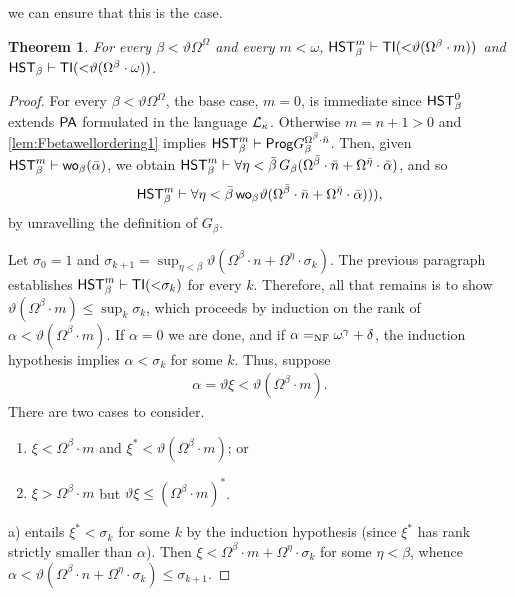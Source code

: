 \documentclass[UKenglish,cleveref,DIV=12]{scrartcl}
\newtheorem{theorem}{Theorem}[section]
\theoremstyle{definition}
\theoremstyle{definition}
\begin{document}
we can ensure that this is the case. %
\begin{theorem}\label{thm:Fbetalowerbound}
  For every $\beta<\vartheta\Omega^\Omega$ and every $m<\omega$,
  $\mathsf{HST}_\beta^{m}\vdash\mathsf{TI}(\mathord<\vartheta(\Omega^\beta\cdot m))$ and $\mathsf{HST}_\beta\vdash\mathsf{TI}(\mathord<\vartheta(\Omega^\beta\cdot\omega))$.
\end{theorem}
\begin{proof}
For every $\beta<\vartheta\Omega^\Omega$, the base case, $m=0$, is immediate
since $\mathsf{HST}_\beta^0$ extends $\mathsf{PA}$ formulated in the language $\mathcal{L}_\kappa$.
Otherwise $m=n+1>0$ and \cref{lem:Fbetawellordering1} implies $\mathsf{HST}_\beta^m\vdash\mathsf{Prog}
G_\beta^{\Omega^{\bar\beta}\cdot\bar n}$. Then, given $\mathsf{HST}_\beta^m\vdash
\mathsf{wo}_\beta(\bar \alpha)$, we obtain $\mathsf{HST}_\beta^m\vdash
\forall\eta<\bar\beta\,G_\beta(\Omega^{\bar\beta}\cdot\bar
n+\Omega^{\bar\eta}\cdot\bar\alpha)$, and so
\begin{align*}
  \mathsf{HST}_\beta^m\vdash\forall\eta<\bar\beta\,\mathsf{wo}_\beta\vartheta(\Omega^{\bar \beta}\cdot\bar
  n+\Omega^{\bar \eta}\cdot\bar\alpha))),
\end{align*}
by unravelling the definition of $G_\beta$.

Let $\sigma_0=1$ and $\sigma_{k+1}=\sup_{\eta<\beta}\vartheta(\Omega^{\beta}\cdot
n+\Omega^\eta\cdot\sigma_k)$. The previous paragraph establishes $\mathsf{HST}_\beta^m\vdash
\mathsf{TI}(\mathord<\sigma_k)$ for every $k$. Therefore, all that remains is to show
$\vartheta(\Omega^{\beta}\cdot m)\le\sup_k\sigma_k$, which proceeds by induction
on the rank of $\alpha<\vartheta(\Omega^{\beta}\cdot m)$. If $\alpha=0$ we are
done, and if $\alpha=_{\mathrm{NF}}\omega^\gamma+\delta$, the induction hypothesis implies
$\alpha<\sigma_k$ for some $k$. Thus, suppose
\begin{gather*}
  \alpha=\vartheta\xi<\vartheta(\Omega^{\beta}\cdot m).
\end{gather*}
There are two cases to consider.
\begin{enumerate}
 \item $\xi<\Omega^{\beta}\cdot m$ and $\xi^*<\vartheta(\Omega^{\beta}\cdot m)$; or
 \item $\xi>\Omega^{\beta}\cdot m$ but $\vartheta\xi\le(\Omega^{\beta}\cdot m)^*$.
\end{enumerate}
a) entails $\xi^*<\sigma_k$ for some $k$ by the induction hypothesis
(since $\xi^*$ has rank strictly smaller than $\alpha$). Then
$\xi<\Omega^{\beta}\cdot m+\Omega^\eta\cdot\sigma_k$ for some $\eta<\beta$, whence
$\alpha<\vartheta(\Omega^{\beta}\cdot n+\Omega^\eta\cdot\sigma_k)\le\sigma_{k+1}$.


\end{proof}
\end{document}
